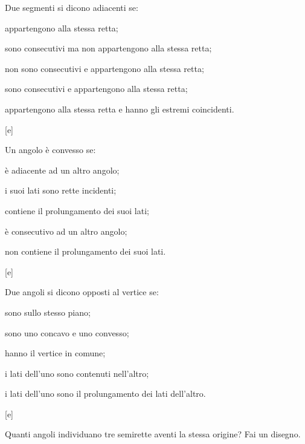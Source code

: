 \begin{esercizio}
\label{ese:1.50}
Due segmenti si dicono adiacenti se:
\begin{enumeratea}
\item appartengono alla stessa retta;
\item sono consecutivi ma non appartengono alla stessa retta;
\item non sono consecutivi e appartengono alla stessa retta;
\item sono consecutivi e appartengono alla stessa retta;
\item appartengono alla stessa retta e hanno gli estremi coincidenti.
\end{enumeratea}
\hfill[e]
\end{esercizio}

\begin{esercizio}
\label{ese:1.51}
Un angolo è convesso se:
\begin{enumeratea}
\item è adiacente ad un altro angolo;
\item i suoi lati sono rette incidenti;
\item contiene il prolungamento dei suoi lati;
\item è consecutivo ad un altro angolo;
\item non contiene il prolungamento dei suoi lati.
\end{enumeratea}
\hfill[e]
\end{esercizio}


\begin{esercizio}
\label{ese:1.52}
Due angoli si dicono opposti al vertice se:
\begin{enumeratea}
\item sono sullo stesso piano;
\item sono uno concavo e uno convesso;
\item hanno il vertice in comune;
\item i lati dell'uno sono contenuti nell'altro;
\item i lati dell'uno sono il prolungamento dei lati dell'altro.
\end{enumeratea}
\hfill[e]
\end{esercizio}

\begin{esercizio}
\label{ese:1.53}
Quanti angoli individuano tre semirette aventi la stessa origine? Fai 
un disegno.
\end{esercizio}


